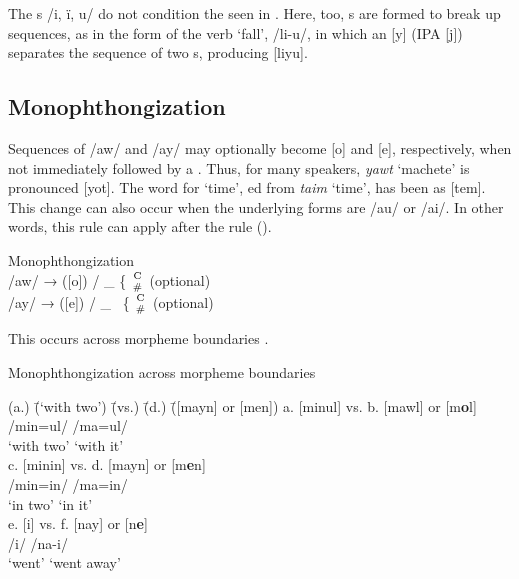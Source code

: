 The s /i, ï, u/ do not condition the  seen in . Here, too,  s are formed to break up  sequences, as in the  form of the verb ‘fall’, /li-u/, in which an  [y] (IPA [j]) separates the sequence of two s, producing [liyu].


\subsection{Monophthongization}\label{sec:2.5.2}


Sequences of /aw/ and /ay/ may optionally become [o] and [e], respectively, when not immediately followed by a . Thus, for many speakers, \textit{yawt} ‘machete’ is pronounced [yot]. The word for ‘time’, ed from  \textit{taim} ‘time’, has been  as [tem]. This change can also occur when the underlying forms are /au/ or /ai/. In other words, this  rule  can apply after the  rule ().

\ea%
    \label{ex:phon:65}
          Monophthongization\\
    /aw/ → ([o]) / \_ \{ $\genfrac{}{}{0pt}{}{\textrm{C}}{\textrm{\#}}$ {  } (optional)\\
    /ay/ → ([e]) / \_ \ \{ $\genfrac{}{}{0pt}{}{\textrm{C}}{\textrm{\#}}$ {  } (optional)
\z

This  occurs across morpheme boundaries .


\ea%
    \label{ex:phon:66}
          Monophthongization across morpheme boundaries\\
\begin{tabbing}    
{(a.)} \= {(‘with two’)} \= {(vs.)} \= {(d.)} \= {([mayn] or [men])}\kill
 {a.} \> {[minul]} \> {vs.} \> {b.} \> {[mawl] or [m\textbf{o}l]}\\
 { } \> {/min=ul/} \> { } \> { } \> {/ma=ul/}\\
 { } \> {‘with two’} \> { } \> { } \>  {‘with it’}\\
 {c.} \> {[minin]} \> {vs.} \> {d.} \> {[mayn] or [m\textbf{e}n]}\\
 { } \> {/min=in/} \> { } \> { } \> {/ma=in/}\\
 { } \> {‘in two’} \> { } \> { } \> {‘in it’}\\
 {e.} \> {[i]} \> {vs.} \> {f.} \> {[nay] or [n\textbf{e}]}\\
 { } \> {/i/} \> { } \> { } \> {/na-i/}\\
 { } \> {‘went’} \> { } \> { } \> {‘went away’}
 \end{tabbing}
  \z


